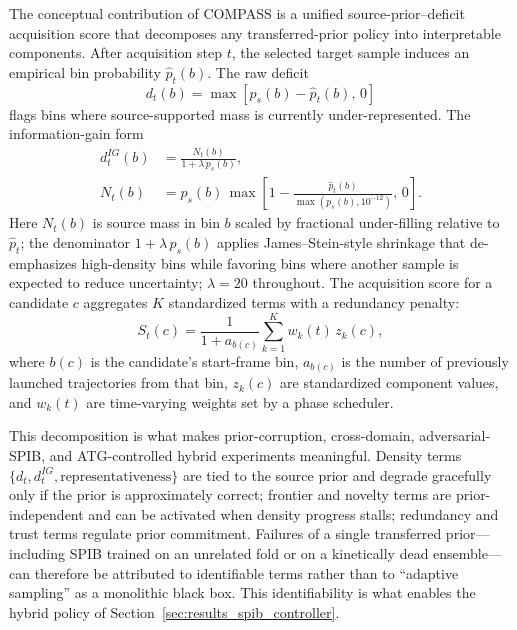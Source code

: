 \documentclass[journal=jctcce,manuscript=article,layout=twocolumn]{achemso}
\begin{document}
The conceptual contribution of COMPASS is a unified source-prior--deficit acquisition score that decomposes any transferred-prior policy into interpretable components. After acquisition step $t$, the selected target sample induces an empirical bin probability $\hat{p}_t(b)$. The raw deficit
\begin{equation}
    d_t(b) = \max\!\left[p_s(b) - \hat{p}_t(b),\,0\right]
    \label{eq:raw_deficit_online}
\end{equation}
flags bins where source-supported mass is currently under-represented. The information-gain form
\begin{equation}
\begin{split}
    d^{IG}_t(b) &= \frac{N_t(b)}{1+\lambda\,p_s(b)},\\
    N_t(b) &= p_s(b)\,\max\!\left[1-\frac{\hat{p}_t(b)}{\max(p_s(b),10^{-12})},\,0\right].
\end{split}
    \label{eq:ig_deficit_online}
\end{equation}
Here $N_t(b)$ is source mass in bin $b$ scaled by fractional under-filling relative to $\hat{p}_t$; the denominator $1+\lambda\,p_s(b)$ applies James--Stein-style shrinkage that de-emphasizes high-density bins while favoring bins where another sample is expected to reduce uncertainty; $\lambda=20$ throughout. The acquisition score for a candidate $c$ aggregates $K$ standardized terms with a redundancy penalty:
\begin{equation}
    S_t(c) = \frac{1}{1+a_{b(c)}}\sum_{k=1}^{K} w_k(t)\,z_k(c),
    \label{eq:score_online}
\end{equation}
where $b(c)$ is the candidate's start-frame bin, $a_{b(c)}$ is the number of previously launched trajectories from that bin, $z_k(c)$ are standardized component values, and $w_k(t)$ are time-varying weights set by a phase scheduler.

This decomposition is what makes prior-corruption, cross-domain, adversarial-SPIB, and ATG-controlled hybrid experiments meaningful. Density terms $\{d_t,d^{IG}_t,\text{representativeness}\}$ are tied to the source prior and degrade gracefully only if the prior is approximately correct; frontier and novelty terms are prior-independent and can be activated when density progress stalls; redundancy and trust terms regulate prior commitment. Failures of a single transferred prior---including SPIB trained on an unrelated fold or on a kinetically dead ensemble---can therefore be attributed to identifiable terms rather than to ``adaptive sampling'' as a monolithic black box. This identifiability is what enables the hybrid policy of Section~\ref{sec:results_spib_controller}.
\end{document}
